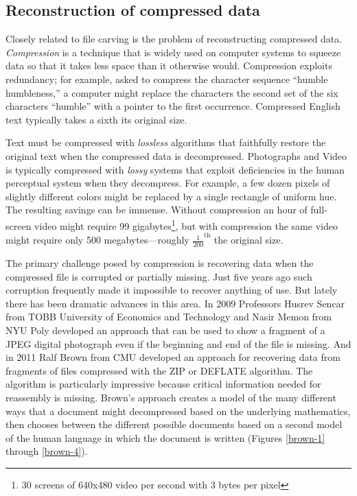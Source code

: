 \documentclass[11pt,letter]{article}
\begin{document}
\subsection{Reconstruction of compressed data}

Closely related to file carving is the problem of reconstructing
compressed data. \emph{Compression} is a technique that is widely used
on computer systems to squeeze data so that it takes less space than
it otherwise would. Compression exploits redundancy; for example,
asked to compress the character sequence ``humble humbleness,'' a computer might
replace the characters the second set of the six characters ``humble''
with a pointer to the first occurrence. Compressed English text typically
takes a sixth its original size.

Text must be compressed with \emph{lossless} algorithms that
faithfully restore the original text when the compressed data is
decompressed. Photographs and Video is
typically compressed with \emph{lossy} systems that exploit
deficiencies in the human perceptual system when they decompress. For
example, a few dozen pixels of slightly different colors might
be replaced by a single rectangle of uniform hue. The resulting
savings can be immense. Without compression an hour of
full-screen video might require 99 gigabytes\footnote{30 screens of
  640x480 video per second with 3 bytes per pixel}, but with
compression the same video might require only 500 megabytes---roughly
$\frac{1}{200}^\textrm{th}$ the original size. 

The primary challenge posed by compression is recovering data when the
compressed file is corrupted or partially missing. Just five years ago
such corruption frequently made it impossible to recover anything of
use. But lately there has been dramatic advances in this area. In 2009
Professors Husrev Sencar from TOBB University of Economics and
Technology and Nasir Memon from NYU Poly developed an approach that
can be used to show a fragment of a JPEG digital photograph even if
the beginning and end of the file is missing\cite{jpeg-recovery}. And
in 2011 Ralf Brown from CMU developed an approach for recovering data
from fragments of files compressed with the ZIP or DEFLATE
algorithm\cite{dfrws2011:RalfBrown}. The algorithm is particularly
impressive because critical information needed for reassembly is
missing. Brown's approach creates a model of the many different ways
that a document might decompressed based on the underlying
mathematics, then chooses between the different possible documents
based on a second model of the human language in which the document is
written (Figures \ref{brown-1} through \ref{brown-4}).
\end{document}
